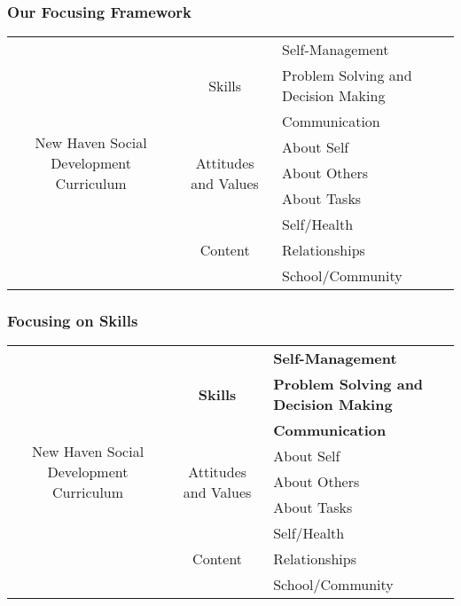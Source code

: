 \documentclass[aspectratio=169]{beamer}
\newcommand{\tBold}[1]{\textcolor{FSUred}{\textbf{#1}}}
\begin{document}
	\begin{frame}
		\frametitle{\textsf{Our Focusing Framework}}
		\footnotesize\begin{tabular}{ccl}
			\toprule
			\multirow{9}{*}{\parbox[l]{5cm}{\flushleft\huge New Haven Social Development Curriculum \footnotesize}} & \multirow{3}{*}{\normalsize Skills \footnotesize} & Self-Management \\
			 & & Problem Solving and Decision Making \\
			 & & Communication \\
			\cline{2-3}
			 & \multirow{3}{*}{\normalsize Attitudes and Values \footnotesize} & About Self \\
			 & & About Others \\
			 & & About Tasks \\
			 \cline{2-3}
			 & \multirow{3}{*}{\normalsize Content \footnotesize} & Self/Health \\
			 & & Relationships \\
			 & & School/Community \\
			 \bottomrule
		\end{tabular}
	\end{frame}

	\begin{frame}
		\frametitle{\textsf{Focusing on Skills}}
		\footnotesize\begin{tabular}{ccl}
			\toprule
			\multirow{9}{*}{\parbox[l]{5cm}{\flushleft\huge New Haven Social Development Curriculum \footnotesize}} & \multirow{3}{*}{\normalsize \tBold{Skills} \footnotesize} & \tBold{Self-Management} \\
			 & & \tBold{Problem Solving and Decision Making} \\
			 & & \tBold{Communication} \\
			\cline{2-3}
			 & \multirow{3}{*}{\normalsize Attitudes and Values \footnotesize} & About Self \\
			 & & About Others \\
			 & & About Tasks \\
			 \cline{2-3}
			 & \multirow{3}{*}{\normalsize Content \footnotesize} & Self/Health \\
			 & & Relationships \\
			 & & School/Community \\
			 \bottomrule
		\end{tabular}
	\end{frame}
\end{document}
